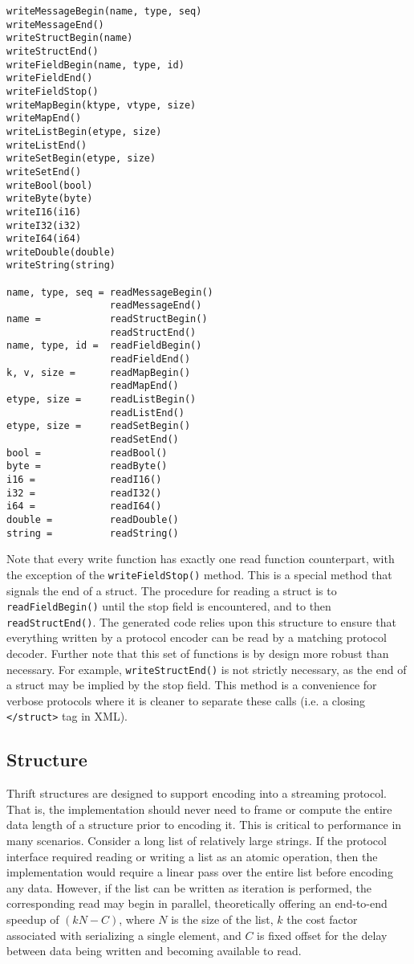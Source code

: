 \documentclass[nocopyrightspace,blockstyle]{sigplanconf}
\begin{document}
\begin{verbatim}
writeMessageBegin(name, type, seq)
writeMessageEnd()
writeStructBegin(name)
writeStructEnd()
writeFieldBegin(name, type, id)
writeFieldEnd()
writeFieldStop()
writeMapBegin(ktype, vtype, size)
writeMapEnd()
writeListBegin(etype, size)
writeListEnd()
writeSetBegin(etype, size)
writeSetEnd()
writeBool(bool)
writeByte(byte)
writeI16(i16)
writeI32(i32)
writeI64(i64)
writeDouble(double)
writeString(string)

name, type, seq = readMessageBegin()
                  readMessageEnd()
name =            readStructBegin()
                  readStructEnd()
name, type, id =  readFieldBegin()
                  readFieldEnd()
k, v, size =      readMapBegin()
                  readMapEnd()
etype, size =     readListBegin()
                  readListEnd()
etype, size =     readSetBegin()
                  readSetEnd()
bool =            readBool()
byte =            readByte()
i16 =             readI16()
i32 =             readI32()
i64 =             readI64()
double =          readDouble()
string =          readString()
\end{verbatim}

Note that every write function has exactly one read function counterpart, with
the exception of the \texttt{writeFieldStop()} method. This is a special method
that signals the end of a struct. The procedure for reading a struct is to
\texttt{readFieldBegin()} until the stop field is encountered, and to then
\texttt{readStructEnd()}.  The
generated code relies upon this structure to ensure that everything written by
a protocol encoder can be read by a matching protocol decoder. Further note
that this set of functions is by design more robust than necessary.
For example, \texttt{writeStructEnd()} is not strictly necessary, as the end of
a struct may be implied by the stop field. This method is a convenience for
verbose protocols where it is cleaner to separate these calls (i.e. a closing
\texttt{</struct>} tag in XML).

\subsection{Structure}

Thrift structures are designed to support encoding into a streaming
protocol. That is, the implementation should never need to frame or compute the
entire data length of a structure prior to encoding it. This is critical to
performance in many scenarios. Consider a long list of relatively large
strings. If the protocol interface required reading or writing a list as an
atomic operation, then the implementation would require a linear pass over the
entire list before encoding any data. However, if the list can be written
as iteration is performed, the corresponding read may begin in parallel,
theoretically offering an end-to-end speedup of $(kN - C)$, where $N$ is the size
of the list, $k$ the cost factor associated with serializing a single
element, and $C$ is fixed offset for the delay between data being written
and becoming available to read.
\end{document}

